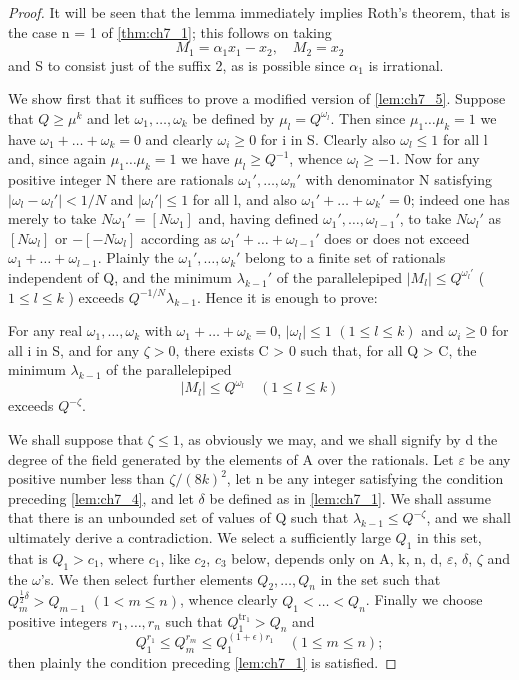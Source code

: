 \begin{proof}
It will be seen that the lemma immediately implies Roth's theorem, that is the case n = 1 of \autoref{thm:ch7_1}; this follows on taking
\[M_1 = \alpha_1 x_1 - x_2, \quad M_2 = x_2\]
and S to consist just of the suffix 2, as is possible since  $\alpha_1$  is irrational.

We show first that it suffices to prove a modified version of \autoref{lem:ch7_5}. Suppose that  $Q \geqslant \mu^k$  and let  $\omega_1, \ldots, \omega_k$  be defined by  $\mu_l = Q^{\omega_l}$. Then since  $\mu_1 \ldots \mu_k = 1$  we have  $\omega_1 + \ldots + \omega_k = 0$  and clearly  $\omega_i \geqslant 0$  for i in S. Clearly also  $\omega_l \leqslant 1$  for all l and, since again  $\mu_1 \ldots \mu_k = 1$  we have  $\mu_l \geqslant Q^{-1}$, whence  $\omega_l \geqslant -1$. Now for any positive integer N there are rationals  $\omega_1', \ldots, \omega_n'$  with denominator N satisfying  $|\omega_l - \omega_l'| < 1/N$  and  $|\omega_l'| \leqslant 1$  for all l, and also  $\omega_1' + \ldots + \omega_k' = 0$; indeed one has merely to take  $N\omega_1' = [N\omega_1]$  and, having defined  $\omega_1', \ldots, \omega_{l-1}'$, to take  $N\omega_l'$  as  $[N\omega_l]$  or  $-[-N\omega_l]$  according as  $\omega_1' + \ldots + \omega_{l-1}'$  does or does not exceed  $\omega_1 + \ldots + \omega_{l-1}$. Plainly the  $\omega_1', \ldots, \omega_k'$  belong to a finite set of rationals independent of Q, and the minimum  $\lambda_{k-1}'$  of the parallelepiped  $|M_l| \leqslant Q^{\omega_l'}$  ( $1 \leqslant l \leqslant k$ ) exceeds  $Q^{-1/N}\lambda_{k-1}$. Hence it is enough to prove:

For any real  $\omega_1, \dots, \omega_k$  with  $\omega_1 + \dots + \omega_k = 0$,  $|\omega_l| \le 1$   $(1 \le l \le k)$  and  $\omega_i \ge 0$  for all i in S, and for any  $\zeta > 0$, there exists C > 0 such that, for all Q > C, the minimum  $\lambda_{k-1}$  of the parallelepiped
\[|M_l| \leqslant Q^{\omega_l} \quad (1 \leqslant l \leqslant k)\]
exceeds  $Q^{-\zeta}$.

We shall suppose that  $\zeta \leq 1$, as obviously we may, and we shall signify by d the degree of the field generated by the elements of A over the rationals. Let  $\varepsilon$  be any positive number less than  $\zeta/(8k)^2$, let n be any integer satisfying the condition preceding \autoref{lem:ch7_4}, and let  $\delta$  be defined as in \autoref{lem:ch7_1}. We shall assume that there is an unbounded set of values of Q such that  $\lambda_{k-1} \leq Q^{-\zeta}$, and we shall ultimately derive a contradiction. We select a sufficiently large  $Q_1$  in this set, that is  $Q_1 > c_1$, where  $c_1$, like  $c_2$,  $c_3$  below, depends only on A, k, n, d,  $\varepsilon$,  $\delta$,  $\zeta$  and the  $\omega$'s. We then select further elements  $Q_2, \ldots, Q_n$  in the set such that  $Q_m^{\frac{1}{2}\delta} > Q_{m-1}$   $(1 < m \leq n)$, whence clearly  $Q_1 < \dots < Q_n$. Finally we choose positive integers  $r_1, \ldots, r_n$  such that  $Q_1^{\text{tr}_1} > Q_n$  and
\[Q_1^{r_1}\leqslant Q_m^{r_m}\leqslant Q_1^{(1+\epsilon)r_1}\quad (1\leqslant m\leqslant n);\]
then plainly the condition preceding \autoref{lem:ch7_1} is satisfied.


\end{proof}

